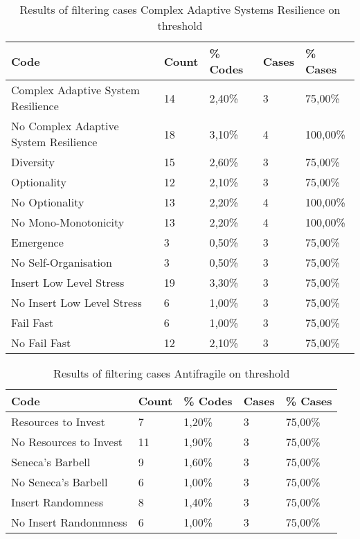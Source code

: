 \begin{table}[htbp]
	\centering
	\begin{tabular}{lllll}
		\toprule
		\textbf{Code} & \textbf{Count} & \textbf{\% Codes} &\textbf{Cases} & \textbf{\% Cases} \\
		\midrule
		Complex Adaptive System Resilience & 14    & 2,40\% & 3     & 75,00\% \\
		No Complex Adaptive System Resilience & 18    & 3,10\% & 4     & 100,00\% \\
		Diversity & 15    & 2,60\% & 3     & 75,00\% \\
		Optionality & 12    & 2,10\% & 3     & 75,00\% \\
		No Optionality & 13    & 2,20\% & 4     & 100,00\% \\
		No Mono-Monotonicity & 13    & 2,20\% & 4     & 100,00\% \\
		Emergence & 3     & 0,50\% & 3     & 75,00\% \\
		No Self-Organisation & 3     & 0,50\% & 3     & 75,00\% \\
		Insert Low Level Stress & 19    & 3,30\% & 3     & 75,00\% \\
		No Insert Low Level Stress & 6     & 1,00\% & 3     & 75,00\% \\
		Fail Fast & 6     & 1,00\% & 3     & 75,00\% \\
		No Fail Fast & 12    & 2,10\% & 3     & 75,00\% \\
		\bottomrule
	\end{tabular}%
	\caption{Results of filtering cases Complex Adaptive Systems Resilience on threshold}%
	\label{tab:resultsfilteringcasresilience}%
\end{table}%

\begin{table}[htbp]
	\centering
	\begin{tabular}{lllll}
		\toprule
		\textbf{Code} & \textbf{Count} & \textbf{\% Codes} &\textbf{Cases} & \textbf{\% Cases} \\
		\midrule
		Resources to Invest & 7     & 1,20\% & 3     & 75,00\% \\
		No Resources to Invest & 11    & 1,90\% & 3     & 75,00\% \\
		Seneca's Barbell & 9     & 1,60\% & 3     & 75,00\% \\
		No Seneca's Barbell & 6     & 1,00\% & 3     & 75,00\% \\
		Insert Randomness & 8     & 1,40\% & 3     & 75,00\% \\
		No Insert Randonmness & 6     & 1,00\% & 3     & 75,00\% \\
		\bottomrule
	\end{tabular}%
	\caption{Results of filtering cases Antifragile on threshold}%
	\label{tab:resultsfilteringantifragile}%
\end{table}%

